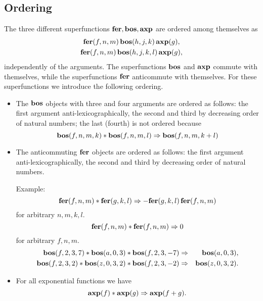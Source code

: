 {\subsection{Ordering}

The three different superfunctions $\mathbf{fer},\mathbf{bos},\mathbf{axp}$ are ordered among
themselves as
\begin{gather*}
  \mathbf{fer}(f,n,m)\,\mathbf{bos}(h,j,k)\,\mathbf{axp}(g), \\
  \mathbf{fer}(f,n,m)\,\mathbf{bos}(h,j,k,l)\,\mathbf{axp}(g),
\end{gather*}
independently of the arguments.  The superfunctions $\mathbf{bos}$ and $\mathbf{axp}$
commute with themselves, while the superfunctions $\mathbf{fer}$ anticommute
with themselves.  For these superfunctions we introduce the following
ordering.

\begin{itemize}
\item The $\mathbf{bos}$ objects with three and four arguments are ordered as
  follows: the first argument anti-lexicographically, the second and
  third by decreasing order of natural numbers; the last (fourth) is
  not ordered because
  \begin{equation*}
    \mathbf{bos}(f,n,m,k)*\mathbf{bos}(f,n,m,l) \Rightarrow \mathbf{bos}(f,n,m,k+l)
  \end{equation*}

\item The anticommuting $\mathbf{fer}$ objects are ordered as follows: the
  first argument anti-lexicographically, the second and third by
  decreasing order of natural numbers.

  Example:
  \begin{equation*}
    \mathbf{fer}(f,n,m)*\mathbf{fer}(g,k,l) \Rightarrow -\mathbf{fer}(g,k,l)\,\mathbf{fer}(f,n,m)
  \end{equation*}
  for arbitrary $n,m,k,l$.
  \begin{equation*}
    \mathbf{fer}(f,n,m)*\mathbf{fer}(f,n,m) \Rightarrow 0
  \end{equation*}
  for arbitrary $f,n,m$.
  \begin{eqnarray*}
    \mathbf{bos}(f,2,3,7)*\mathbf{bos}(a,0,3)*\mathbf{bos}(f,2,3,-7)   & \Rightarrow & \mathbf{bos}(a,0,3), \\
    \mathbf{bos}(f,2,3,2)*\mathbf{bos}(z,0,3,2)*\mathbf{bos}(f,2,3,-2) & \Rightarrow & \mathbf{bos}(z,0,3,2).
  \end{eqnarray*}

\item For all exponential functions we have
  \begin{equation*}
    \mathbf{axp}(f)*\mathbf{axp}(g) \Rightarrow \mathbf{axp}(f+g).
  \end{equation*}
\end{itemize}

}

